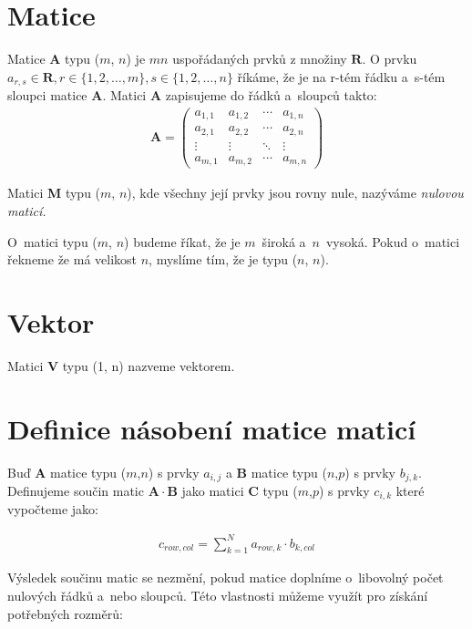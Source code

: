 

\section{Matice}

Matice \textbf{A} typu ($m$, $n$) je $m n$ uspořádaných prvků z množiny $\mathbf{R}$. O prvku $a_{r,s} \in \mathbf{R}, r \in \{1,2,\hdots,m\},s \in \{1,2,\hdots,n\}$ říkáme, že je na r-tém řádku a~s-tém sloupci matice \textbf{A}. Matici \textbf{A} zapisujeme do řádků a~sloupců takto:
\begin{align}
\mathbf{A}=\begin{pmatrix}
a_{1,1} & a_{1,2} & \cdots & a_{1,n} \\
a_{2,1} & a_{2,2} & \cdots & a_{2,n} \\
\vdots  & \vdots  & \ddots & \vdots  \\
a_{m,1} & a_{m,2} & \cdots & a_{m,n}
\end{pmatrix}
\end{align}

Matici \textbf{M} typu ($m$, $n$), kde všechny její prvky jsou rovny nule, nazýváme \textit{nulovou maticí.}

O~matici typu ($m$, $n$) budeme říkat, že je $m$~široká a~$n$~vysoká. Pokud o~matici řekneme že má velikost $n$, myslíme tím, že je typu ($n$, $n$).

\section{Vektor}

Matici \textbf{V} typu (1, n) nazveme vektorem.

\section{Definice násobení matice maticí}
\label{defmmm}

Buď \textbf{A} matice typu ($m$,$n$) s prvky $a_{i,j}$ a \textbf{B} matice typu ($n$,$p$) s prvky $b_{j,k}$. Definujeme součin matic $\mathbf{A} \cdot \mathbf{B}$ jako matici \textbf{C} typu ($m$,$p$) s prvky $c_{i,k}$ které vypočteme jako:

\begin{align}
c_{row,col}=\sum_{k=1}^{N} a_{row,k} \cdot b_{k,col}
\end{align}

Výsledek součinu matic se nezmění, pokud matice doplníme o~libovolný počet nulových řádků a~nebo sloupců. Této vlastnosti můžeme využít pro získání potřebných rozměrů:


